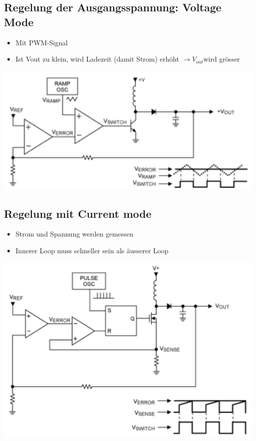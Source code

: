 \begin{minipage}{0.49\textwidth}
\subsection{Regelung der Ausgangsspannung: Voltage Mode}
\begin{itemize}
  \item Mit PWM-Signal
  \item Ist Vout zu klein, wird Ladezeit (damit Strom) erhöht $\to V_{out}$wird
  grösser
\end{itemize}

\includegraphics[width=\textwidth]{pictures/ausgangsspannungsregelung}

\end{minipage}
\begin{minipage}{0.49\textwidth}
\subsection{Regelung mit Current mode}
\begin{itemize}
  \item Strom und Spannung werden gemessen
  \item Innerer Loop muss schneller sein als äusserer Loop
\end{itemize}

\includegraphics[width=\textwidth]{pictures/currentmode}

\end{minipage}



